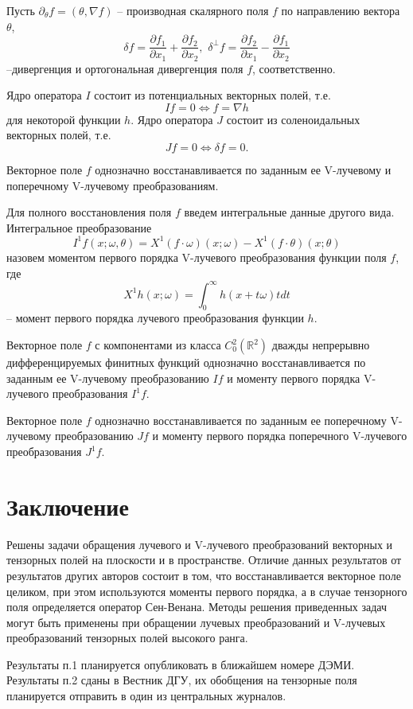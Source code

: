 Пусть $\partial_\theta f=(\theta,\nabla f)$ – производная скалярного поля $f$ по направлению вектора $\theta$, 
$$\delta f=\frac{\partial f_1}{\partial x_1}+\frac{\partial f_2}{\partial x_2},\,\, \delta^\bot f=\frac{\partial f_2}{\partial x_1}-\frac{\partial f_1}{\partial x_2}$$
–дивергенция и ортогональная дивергенция поля $f$, соответственно.


\begin{theorem} Ядро оператора $I$ состоит из потенциальных векторных полей, т.е.
$$If=0 \Leftrightarrow f=\nabla h$$ 
для некоторой функции $h$.
Ядро оператора $J$ состоит из соленоидальных векторных полей, т.е.
$$Jf=0  \Leftrightarrow  \delta f=0.$$
\end{theorem}

\begin{theorem} Векторное поле $f$ однозначно восстанавливается по заданным ее V-лучевому и поперечному V-лучевому преобразованиям.
\end{theorem}

Для полного восстановления поля $f$ введем интегральные данные другого вида.
Интегральное преобразование 
$$I^1 f(x;\omega,\theta)=X^1 (f\cdot\omega)(x;\omega)-X^1 (f\cdot\theta)(x;\theta)$$
назовем моментом первого порядка V-лучевого преобразования функции поля $f$, где
$$X^1 h(x;\omega)=\int_0^\infty h(x+t\omega )tdt$$
– момент первого порядка лучевого преобразования функции $h$.

\begin{theorem} Векторное поле $f$ с компонентами из класса $C_0^2 (\mathbb R^2 )$ дважды непрерывно дифференцируемых финитных функций однозначно восстанавливается по заданным ее V-лучевому преобразованию $If$ и моменту первого порядка V-лучевого преобразования $I^1 f$.
\end{theorem}

\begin{theorem} Векторное поле $f$ однозначно восстанавливается по заданным ее поперечному V-лучевому преобразованию $Jf$ и моменту первого порядка поперечного V-лучевого преобразования $J^1 f$.
\end{theorem}




\section{Заключение}
Решены задачи обращения лучевого и V-лучевого преобразований векторных и тензорных полей на плоскости и в пространстве. Отличие данных результатов от результатов других авторов состоит в том, что восстанавливается векторное поле целиком, при этом используются моменты первого порядка, а в случае тензорного поля определяется оператор Сен-Венана.
Методы решения приведенных задач могут быть применены при обращении лучевых преобразований и V-лучевых преобразований тензорных полей высокого ранга.

Результаты п.1 планируется опубликовать в ближайшем номере ДЭМИ.
Результаты п.2 сданы в Вестник ДГУ, их обобщения на тензорные поля планируется отправить в один из центральных журналов.



